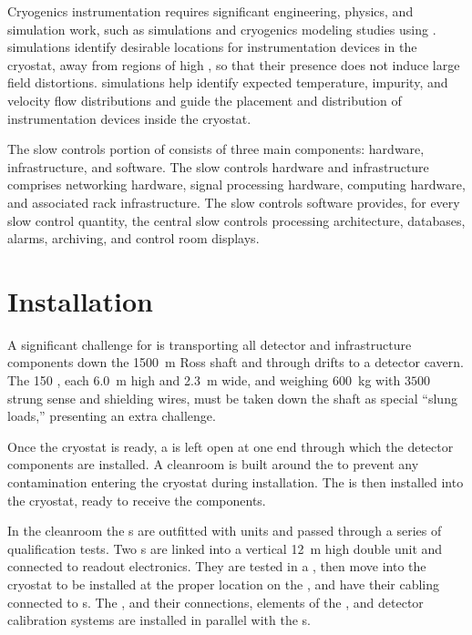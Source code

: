 Cryogenics instrumentation %
requires significant engineering, physics, and
simulation work, such as \efield simulations and cryogenics modeling
studies using . \efield simulations
identify desirable locations for instrumentation
devices in the cryostat, away from %
regions of high \efield, so that %
their presence does not induce large field distortions. 
 simulations help identify %
expected temperature, impurity, and velocity flow distributions and guide the placement and distribution of instrumentation devices inside the cryostat.

The slow controls portion of  consists of three main components: 
hardware, infrastructure, and software. The slow controls hardware and infrastructure comprises networking hardware, signal processing hardware, computing hardware, and associated rack infrastructure. The slow controls software provides, for every slow control quantity, the central slow controls processing architecture, databases, alarms, archiving, and control room displays.


\section{Installation}

A significant challenge for  is transporting all detector and infrastructure components down the \SI{1500}{\meter} Ross shaft and through drifts to a detector cavern. The 150 , each \SI{6.0}{m} high and \SI{2.3}{m} wide, and  weighing \SI{600}{kg} with $3500$ strung sense and shielding wires, must be taken down the shaft as special ``slung loads,'' presenting an extra challenge. 

Once the  cryostat is ready, %
a  is left open at one end through which the detector components are installed. A cleanroom is built around the  to prevent any contamination entering the cryostat during installation. The  is then installed into the cryostat, ready to receive the  components. 

In the cleanroom the s are outfitted  with  units and passed through a series of qualification tests.
Two s are linked into a vertical \SI{12}{m} high double unit and connected to readout electronics. 
They are tested in a \coldbox, then move into the cryostat to be installed at the proper location on the , and have their cabling connected to \fdth{}s. 
The ,  and their  connections, elements of the , and detector calibration systems are installed in parallel with the s. 

